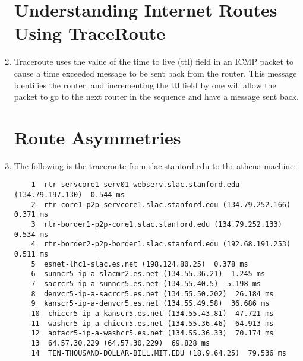 \documentclass[psamsfonts]{amsart}
\begin{document}
\begin{enumerate}
    \section{Understanding Internet Routes Using TraceRoute}

  \item Traceroute uses the value of the time to live (ttl) field in an ICMP packet to cause a time exceeded message to be sent back from the router. This message identifies the router, and incrementing the ttl field by one will allow the packet to go to the next router in the sequence and have a message sent back.

    \section{Route Asymmetries}

  \item The following is the traceroute from slac.stanford.edu to the athena machine:
    \begin{verbatim}
    1  rtr-servcore1-serv01-webserv.slac.stanford.edu (134.79.197.130)  0.544 ms
    2  rtr-core1-p2p-servcore1.slac.stanford.edu (134.79.252.166)  0.371 ms
    3  rtr-border1-p2p-core1.slac.stanford.edu (134.79.252.133)  0.534 ms
    4  rtr-border2-p2p-border1.slac.stanford.edu (192.68.191.253)  0.511 ms
    5  esnet-lhc1-slac.es.net (198.124.80.25)  0.378 ms
    6  sunncr5-ip-a-slacmr2.es.net (134.55.36.21)  1.245 ms
    7  sacrcr5-ip-a-sunncr5.es.net (134.55.40.5)  5.198 ms
    8  denvcr5-ip-a-sacrcr5.es.net (134.55.50.202)  26.184 ms
    9  kanscr5-ip-a-denvcr5.es.net (134.55.49.58)  36.686 ms
    10  chiccr5-ip-a-kanscr5.es.net (134.55.43.81)  47.721 ms
    11  washcr5-ip-a-chiccr5.es.net (134.55.36.46)  64.913 ms
    12  aofacr5-ip-a-washcr5.es.net (134.55.36.33)  70.174 ms
    13  64.57.30.229 (64.57.30.229)  69.828 ms
    14  TEN-THOUSAND-DOLLAR-BILL.MIT.EDU (18.9.64.25)  79.536 ms
    \end{verbatim}


\end{enumerate}
\end{document}
